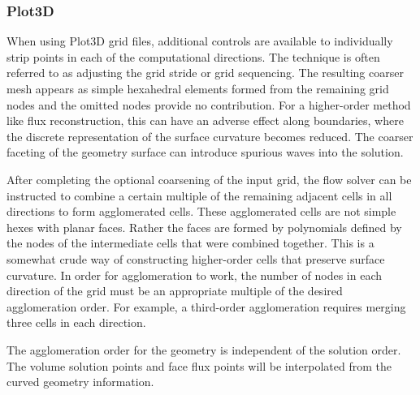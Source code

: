 \subsubsection{Plot3D}
\label{SEC:Files:Grid_Input:Plot3d}


When using Plot3D grid files, additional controls are available to
individually strip points in each of the computational directions.
%
The technique is often referred to as adjusting the grid stride or
grid sequencing.
%
The resulting coarser mesh appears as simple hexahedral elements
formed from the remaining grid nodes and the omitted nodes
provide no contribution.
%
For a higher-order method like flux reconstruction, this can have
an adverse effect along boundaries, where the discrete representation
of the surface curvature becomes reduced.
%
The coarser faceting of the geometry surface can introduce
spurious waves into the solution.

After completing the optional coarsening of the input grid, the
flow solver can be instructed to combine a certain multiple of the
remaining adjacent cells in all directions to form agglomerated cells.
%
These agglomerated cells are not simple hexes with planar faces.
%
Rather the faces are formed by polynomials defined by the nodes of the
intermediate cells that were combined together.
%
This is a somewhat crude way of constructing higher-order cells that
preserve surface curvature.
%
In order for agglomeration to work, the number of nodes
in each direction of the grid must be an appropriate multiple of
the desired agglomeration order.
%
For example, a third-order agglomeration requires merging three
cells in each direction.

\NOTE
The agglomeration order for the geometry is independent of the
solution order.
%
The volume solution points and face flux points will be interpolated
from the curved geometry information.





